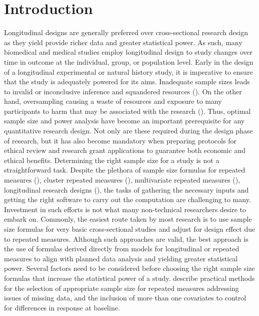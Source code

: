 \documentclass[oupdraft]{bio}
\begin{document}
\section{Introduction}
\label{sec1}
Longitudinal designs are generally preferred over cross-sectional research design as they yield provide richer data and greater statistical power. As such, many biomedical and medical studies employ longitudinal design to study changes over time in outcome at the individual, group, or population level. Early in the design of a longitudinal experimental or natural history study, it is imperative to ensure that the study is adequately powered for its aims.  Inadequate sample sizes leads to invalid or inconclusive inference and squandered resources (\cite{Lu_Methrotra_Liu(2009),Yan_Su(2006)}). On the other hand,  oversampling causing a waste of resources and exposure to many participants to harm that may be associated with the research (\cite{Lu_Methrotra_Liu(2009)}). Thus, optimal sample size and power analysis have become an important prerequisite for any quantitative research design. Not only are these required during the design phase of research, but it has also become mandatory when preparing protocols for ethical review and research grant applications to guarantee both economic and ethical benefits. 
Determining the right sample size for a study is not a straightforward task. Despite the plethora of sample size formulas for repeated measures (\cite{Overall_Doyle(1994),Lui(1992),Rochon(1991), Guo_etal(2013)}), cluster repeated measures (\cite{Liu_Shih_Gehan(2002)}), multivariate repeated measures (\cite{Vonesh_Schork(1986),Guo_Johnson(1996)}), longitudinal research designs (\cite{Lefante(1990)}), the tasks of gathering the necessary inputs and getting the right software to carry out the computation are challenging to many. Investment in such efforts is not what many non-technical researchers desire to embark on. Commonly, the easiest route taken by most research is to use sample size formulas for very basic cross-sectional studies and adjust for design effect due to repeated measures. Although such approaches are valid, the best approach is the use of formulas derived directly from models for longitudinal or repeated measures to align with planned data analysis and yielding greater statistical power. 
Several factors need to be considered before choosing the right sample size formulas that increase the statistical power of a study. \cite{Guo_etal(2013)} describe practical methods for the selection of appropriate sample size for repeated measures addressing issues of missing data, and the inclusion of more than one covariates to control for differences in response at baseline. 
	
\end{document}
